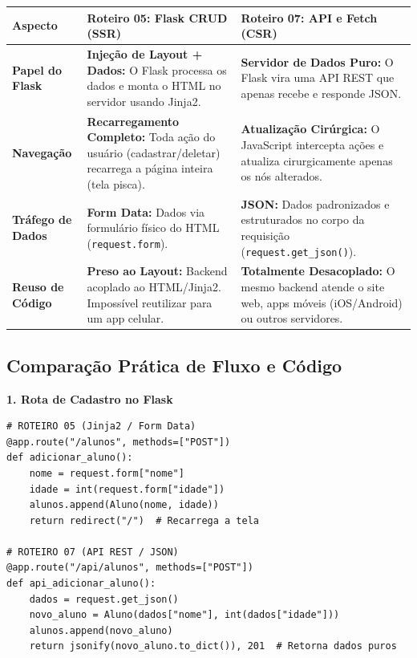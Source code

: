 \documentclass[12pt,a4paper]{article}
\begin{document}
\vspace{0.3cm}
\begin{center}
\small
\renewcommand{\arraystretch}{1.4}
\begin{tabularx}{\linewidth}{|p{3.2cm}|X|X|}
\hline
\rowcolor{azulTitulo}
\color{white}\textbf{Aspecto} & 
\color{white}\textbf{Roteiro 05: Flask CRUD (SSR)} & 
\color{white}\textbf{Roteiro 07: API e Fetch (CSR)} \\ \hline

\textbf{Papel do Flask} & 
\textbf{Injeção de Layout + Dados:} O Flask processa os dados e monta o HTML no servidor usando Jinja2. & 
\textbf{Servidor de Dados Puro:} O Flask vira uma API REST que apenas recebe e responde JSON. \\ \hline

\textbf{Navegação} & 
\textbf{Recarregamento Completo:} Toda ação do usuário (cadastrar/deletar) recarrega a página inteira (tela pisca). & 
\textbf{Atualização Cirúrgica:} O JavaScript intercepta ações e atualiza cirurgicamente apenas os nós alterados. \\ \hline

\textbf{Tráfego de Dados} & 
\textbf{Form Data:} Dados via formulário físico do HTML (\texttt{request.form}). & 
\textbf{JSON:} Dados padronizados e estruturados no corpo da requisição (\texttt{request.get\_json()}). \\ \hline

\textbf{Reuso de Código} & 
\textbf{Preso ao Layout:} Backend acoplado ao HTML/Jinja2. Impossível reutilizar para um app celular. & 
\textbf{Totalmente Desacoplado:} O mesmo backend atende o site web, apps móveis (iOS/Android) ou outros servidores. \\ \hline
\end{tabularx}
\end{center}

\newpage

\subsection*{Comparação Prática de Fluxo e Código}

\textbf{1. Rota de Cadastro no Flask}
\begin{boxCodigo}
\begin{verbatim}
# ROTEIRO 05 (Jinja2 / Form Data)
@app.route("/alunos", methods=["POST"])
def adicionar_aluno():
    nome = request.form["nome"]
    idade = int(request.form["idade"])
    alunos.append(Aluno(nome, idade))
    return redirect("/")  # Recarrega a tela

# ROTEIRO 07 (API REST / JSON)
@app.route("/api/alunos", methods=["POST"])
def api_adicionar_aluno():
    dados = request.get_json()
    novo_aluno = Aluno(dados["nome"], int(dados["idade"]))
    alunos.append(novo_aluno)
    return jsonify(novo_aluno.to_dict()), 201  # Retorna dados puros
\end{verbatim}
\end{boxCodigo}
\end{document}

